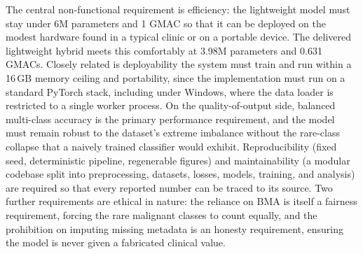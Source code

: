 The central non-functional requirement is efficiency: the lightweight model
must stay under 6M parameters and 1 GMAC so that it can be deployed on the
modest hardware found in a typical clinic or on a portable device. The
delivered lightweight hybrid meets this comfortably at 3.98M parameters and
0.631 GMACs. Closely related is deployability the system must train and
run within a 16\,GB memory ceiling and portability, since the
implementation must run on a standard PyTorch stack, including under Windows,
where the data loader is restricted to a single worker process. On the
quality-of-output side, balanced multi-class accuracy is the primary
performance requirement, and the model must remain robust to the dataset's
extreme imbalance without the rare-class collapse that a naively trained
classifier would exhibit. Reproducibility (fixed seed, deterministic
pipeline, regenerable figures) and maintainability (a modular codebase split
into preprocessing, datasets, losses, models, training, and analysis) are
required so that every reported number can be traced to its source. Two
further requirements are ethical in nature: the reliance on BMA is itself a
fairness requirement, forcing the rare malignant classes to count equally,
and the prohibition on imputing missing metadata is an honesty requirement,
ensuring the model is never given a fabricated clinical value.

